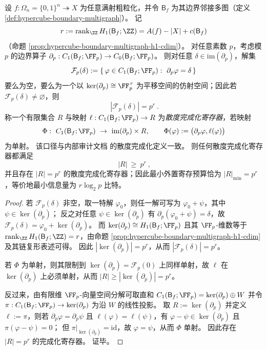 \begin{corollary}[散度完成化的最小外置寄存预算]\label{cor:conclusion-boundary-cycle-rank-external-info-lower-bound}
设 \(f:\Omega_n=\{0,1\}^n\twoheadrightarrow X\) 为任意满射粗粒化，并令 \(\mathsf B_f\) 为其边界邻接多图（定义 \ref{def:hypercube-boundary-multigraph}）。
记
\[
r:=\operatorname{rank}_{\ZZ}H_1(\mathsf B_f;\ZZ)=A(f)-|X|+c(\mathsf B_f)
\]
（命题 \ref{prop:hypercube-boundary-multigraph-h1-cdim}）。
对任意素数 \(p\)，考虑模 \(p\) 的边界算子 \(\partial_p:C_1(\mathsf B_f;\FF_p)\to C_0(\mathsf B_f;\FF_p)\)。
则对任意 \(\delta\in\mathrm{im}(\partial_p)\)，解集
\[
\mathcal F_p(\delta):=\{\,\varphi\in C_1(\mathsf B_f;\FF_p):\ \partial_p\varphi=\delta\,\}
\]
要么为空，要么为一个以 \(\ker(\partial_p)\cong \FF_p^{\,r}\) 为平移空间的仿射空间；因此若 \(\mathcal F_p(\delta)\neq\varnothing\)，则
\[
\boxed{\ |\mathcal F_p(\delta)|=p^{r}\ }.
\]
称一个有限集合 \(R\) 与映射 \(\ell:C_1(\mathsf B_f;\FF_p)\to R\) 为\emph{散度完成化寄存器}，若映射
\[
\Phi:\ C_1(\mathsf B_f;\FF_p)\ \to\ \operatorname{im}(\partial_p)\times R,
\qquad
\Phi(\varphi):=\bigl(\partial_p\varphi,\ell(\varphi)\bigr)
\]
为单射。
该口径与内部审计文档 \cite{Internal2026BoundaryDivergenceCompletionization} 的散度完成化定义一致。
则任何散度完成化寄存器都满足
\[
\boxed{\ |R|\ \ge\ p^{r}\ },
\]
并且存在 \(|R|=p^r\) 的散度完成化寄存器；因此最小外置寄存预算恰为 \(|R|_{\min}=p^r\)，等价地最小信息量为 \(r\log_2 p\) 比特。
\end{corollary}
\begin{proof}
若 \(\mathcal F_p(\delta)\) 非空，取一特解 \(\varphi_0\)，则任一解可写为 \(\varphi_0+\psi\)，其中 \(\psi\in\ker(\partial_p)\)；
反之对任意 \(\psi\in\ker(\partial_p)\) 有 \(\partial_p(\varphi_0+\psi)=\delta\)，故 \(\mathcal F_p(\delta)=\varphi_0+\ker(\partial_p)\)。
而 \(\ker(\partial_p)\cong H_1(\mathsf B_f;\FF_p)\) 且其 \(\FF_p\)-维数等于 \(\operatorname{rank}_{\ZZ}H_1(\mathsf B_f;\ZZ)=r\)，由命题 \ref{prop:hypercube-boundary-multigraph-h1-cdim} 及其链复形表述可得。
因此 \(|\ker(\partial_p)|=p^{r}\)，从而 \(|\mathcal F_p(\delta)|=p^{r}\)。
\par
若 \(\Phi\) 为单射，则其限制到 \(\ker(\partial_p)=\mathcal F_p(0)\) 上同样单射，故 \(\ell\) 在 \(\ker(\partial_p)\) 上必须单射，从而 \(|R|\ge |\ker(\partial_p)|=p^r\)。
\par
反过来，由有限维 \(\FF_p\)-向量空间分解可取直和
\(
C_1(\mathsf B_f;\FF_p)=\ker(\partial_p)\oplus W
\)
并令 \(\pi:C_1(\mathsf B_f;\FF_p)\to \ker(\partial_p)\) 为沿 \(W\) 的线性投影。
取 \(R:=\ker(\partial_p)\) 并定义 \(\ell:=\pi\)，则若 \(\partial_p\varphi=\partial_p\psi\) 且 \(\ell(\varphi)=\ell(\psi)\)，有 \(\varphi-\psi\in\ker(\partial_p)\) 且 \(\pi(\varphi-\psi)=0\)；
但 \(\pi|_{\ker(\partial_p)}=\mathrm{id}\)，故 \(\varphi=\psi\)，从而 \(\Phi\) 单射。
因此存在 \(|R|=p^r\) 的完成化寄存器。
证毕。
\end{proof}

